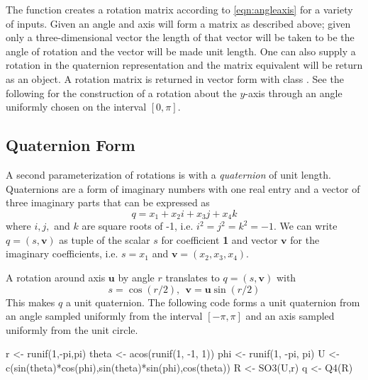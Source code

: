 The function  creates a rotation matrix according to \eqref{eqn:angleaxis} for a variety of inputs.  Given an angle and axis  will form a matrix as described above; given only a three-dimensional vector the length of that vector will be taken to be the angle of rotation and the vector will be made unit length.  One can also supply a rotation in the quaternion representation and the matrix equivalent will be return as an  object.  A rotation matrix is returned in vector form with class .  See the following for the construction of a rotation about the $y$-axis through an angle uniformly chosen on the interval $[0,\pi]$.


\subsection{Quaternion Form}

A second parameterization of rotations is with a {\it quaternion} of unit length.  Quaternions are a form of imaginary numbers with one real entry and a vector of three imaginary parts that can be expressed as
\[
q = x_1 + x_2 i + x_3 j + x_4 k
\]
where $i,j,$ and $k$ are square roots of -1, i.e. $i^2 = j^2= k^2 = -1$.  We can write $q=(s,\bm v)$ as tuple of the scalar $s$ for coefficient {\bf 1} and vector $\bm v$ for the imaginary coefficients, i.e. $s=x_1$ and $\bm v= (x_2, x_3, x_4)$.

A rotation around axis $\bm u$ by angle $r$ translates to $q=(s,\bm v)$ with
\[
s = \cos{(r/2)},  \ \ \bm v = \bm u \sin {(r/2)}
\]
This makes $q$ a unit quaternion.  The following code forms a unit quaternion from an angle sampled uniformly from the interval $[-\pi,\pi]$ and an axis sampled uniformly from the unit circle.

\begin{example}
r <- runif(1,-pi,pi)
theta <- acos(runif(1, -1, 1))
phi <- runif(1, -pi, pi)
U <- c(sin(theta)*cos(phi),sin(theta)*sin(phi),cos(theta))
R <- SO3(U,r)
q <- Q4(R)
\end{example}


